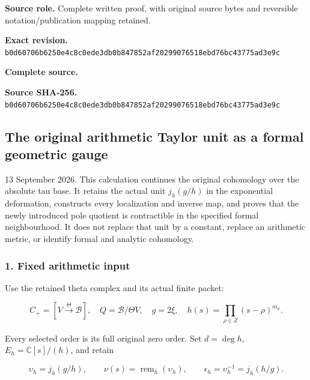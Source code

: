 \documentclass{article}
\begin{document}
\maketitle
\begingroup
\sloppy
\small

\noindent\textbf{Source role.} Complete written proof, with original source bytes and reversible notation/publication mapping retained.\par
\noindent\textbf{Exact revision.} \nolinkurl{b0d60706b6250e4c8c0ede3db0b847852af20299076518ebd76bc43775ad3e9c}\par
\noindent\textbf{Complete source.} \par
\noindent\textbf{Source SHA-256.} \nolinkurl{b0d60706b6250e4c8c0ede3db0b847852af20299076518ebd76bc43775ad3e9c}\par\medskip
\subsection{The original arithmetic Taylor unit as a formal geometric gauge}\label{endpoint-f1_unit_gauge--the-original-arithmetic-taylor-unit-as-a-formal-geometric-gauge}

13 September 2026. This calculation continues the original cohomology over the absolute tau base. It retains the actual unit \(j_h(g/h)\) in the exponential deformation, constructs every localization and inverse map, and proves that the newly introduced pole quotient is contractible in the specified formal neighbourhood. It does not replace that unit by a constant, replace an arithmetic metric, or identify formal and analytic cohomology.

\subsubsection{1. Fixed arithmetic input}\label{endpoint-f1_unit_gauge--fixed-arithmetic-input}

Use the retained theta complex and its actual finite packet:

\[
C_+=[V\xrightarrow{\Theta}\mathscr B],\quad
Q=\mathscr B/\Theta V,\quad g=2\xi,\quad
h(s)=\prod_{\rho\in Z}(s-\rho)^{m_\rho}.
\tag{UG1}
\]

Every selected order is its full original zero order. Set \(d=\deg h\), \(E_h=\mathbb C[s]/(h)\), and retain

\[
\upsilon_h=j_h(g/h),\qquad
\nu(s)=\operatorname{rem}_h(\upsilon_h),\qquad
\epsilon_h=\upsilon_h^{-1}=j_h(h/g).
\tag{UG2}
\]
\end{document}
